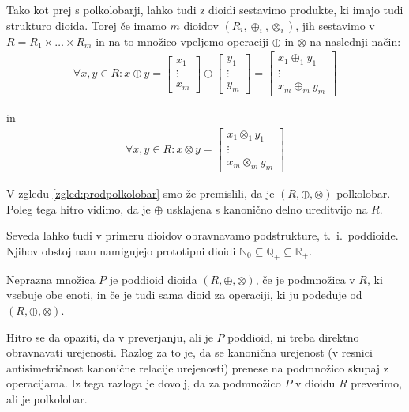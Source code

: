 \documentclass[mat1]{fmfdelo}
\newcommand{\N}{\mathbb{N}}
\newcommand{\No}{\N_0}
\newcommand{\Pplus}[1]{\mathbb{#1}_{+}}
\begin{document}
Tako kot prej s polkolobarji, lahko tudi z dioidi sestavimo produkte, ki imajo tudi strukturo dioida. Torej če imamo $m$ dioidov $(R_{i}, \oplus_{i}, \otimes_{i})$, jih sestavimo v $R = R_1 \times \ldots \times R_m$ in na to množico vpeljemo operaciji $\oplus$ in $\otimes$ na naslednji način: \begin{align*}
	\forall x, y\in R: x \oplus y = \begin{bmatrix}
		x_1 \\
		\vdots \\
		x_m
	\end{bmatrix} \oplus \begin{bmatrix}
		y_1 \\
		\vdots \\
		y_m
	\end{bmatrix} = \begin{bmatrix}
		x_1 \oplus_{1} y_1 \\
		\vdots \\
		x_m \oplus_{m} y_m
	\end{bmatrix}
\end{align*}

in \begin{align*}
	\forall x, y\in R: x \otimes y = \begin{bmatrix}
		x_1 \otimes_{1} y_1 \\
		\vdots \\
		x_m \otimes_{m} y_m
	\end{bmatrix}
\end{align*}

V zgledu \ref{zgled:prodpolkolobar} smo že premislili, da je $(R, \oplus, \otimes)$ polkolobar. Poleg tega hitro vidimo, da je $\oplus$ usklajena s kanonično delno ureditvijo na $R$.

Seveda lahko tudi v primeru dioidov obravnavamo podstrukture, t.~i.~poddioide. Njihov obstoj nam namigujejo prototipni dioidi $\No\subseteq\Pplus{Q}\subseteq\Pplus{R}$. 

\begin{definicija}
	Neprazna množica $P$ je poddioid dioida $(R, \oplus, \otimes)$, če je podmnožica v $R$, ki vsebuje obe enoti, in če je tudi sama dioid za operaciji, ki ju podeduje od $(R, \oplus, \otimes)$.
\end{definicija}

Hitro se da opaziti, da v preverjanju, ali je $P$ poddioid, ni treba direktno obravnavati urejenosti. Razlog za to je, da se kanonična urejenost (v resnici antisimetričnost kanonične relacije urejenosti) prenese na podmnožico skupaj z operacijama. Iz tega razloga je dovolj, da za podmnožico $P$ v dioidu $R$ preverimo, ali je polkolobar.
\end{document}

